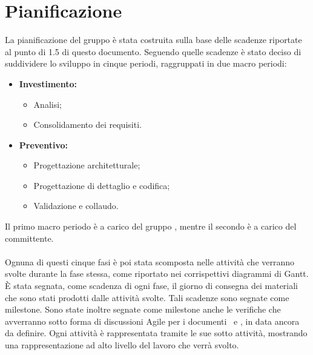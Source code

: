 \documentclass[PianoDiProgetto.tex]{subfiles}
\begin{document}
\chapter{Pianificazione}
La pianificazione del gruppo \gruppo è stata costruita sulla base delle scadenze riportate al punto di 1.5 di questo documento. Seguendo quelle scadenze è stato deciso di suddividere lo sviluppo in cinque periodi, raggruppati in due macro periodi:
\begin{itemize}
	\item \textbf{Investimento:}
		\begin{itemize}
			\item Analisi;
			\item Consolidamento dei requisiti.
		\end{itemize}
	\item \textbf{Preventivo:}
		\begin{itemize}
			\item Progettazione architetturale;
			\item Progettazione di dettaglio e codifica;
			\item Validazione e collaudo.
		\end{itemize}
\end{itemize}
Il primo macro periodo è a carico del gruppo \gruppo, mentre il secondo è a carico del committente.\\\\
Ognuna di questi cinque fasi è poi stata scomposta nelle attività che verranno svolte durante la fase stessa, come riportato nei corrispettivi diagrammi di Gantt. \`{E} stata segnata, come scadenza di ogni fase, il giorno di consegna dei materiali che sono stati prodotti dalle attività svolte. Tali scadenze sono segnate come milestone. Sono state inoltre segnate come milestone anche le verifiche che avverranno sotto forma di discussioni Agile per i documenti \technology\ e \product, in data ancora da definire. Ogni attività è rappresentata tramite le sue sotto attività, mostrando una rappresentazione ad alto livello del lavoro che verrà svolto.
\newpage
\end{document}
